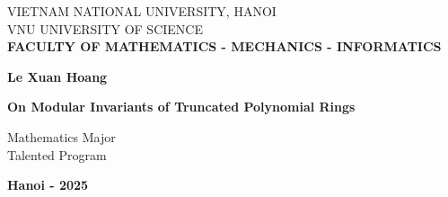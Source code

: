 \documentclass[12pt,a4paper]{report}
\theoremstyle{definition}
\theoremstyle{remark}
\theoremstyle{definition}
\begin{document}
\begin{titlepage}
	\thisfancypage{
		\setlength{\fboxsep}{1pt}
		\setlength{\fboxrule}{1.2pt}
		\doublebox}{}
	\vspace*{-0.5cm}
	\begin{center}
		{\fontsize{13pt}{1}\selectfont  VIETNAM NATIONAL UNIVERSITY, HANOI} \\
			{\fontsize{13pt}{1}\selectfont  VNU UNIVERSITY OF SCIENCE} \\
			{\fontsize{13pt}{1}\selectfont  \bf FACULTY OF MATHEMATICS - MECHANICS - INFORMATICS}
	\end{center}
	\vspace*{2.5cm}
	\begin{center}
		{\bf\fontsize{14pt}{1}\selectfont Le Xuan Hoang}
	\end{center}
	\vspace*{2.5cm}
	\begin{center}
		{\bf\fontsize{18pt}{1}\selectfont On Modular Invariants of Truncated Polynomial Rings}
	\end{center}
	\vspace*{0.5cm}
	\begin{center}
		{\fontsize{14pt}{1}\selectfont Mathematics Major}\\
		{\fontsize{14pt}{1}\selectfont Talented Program}\\
	\end{center}
	\vspace*{0.5cm}
	
	\vfill
	\begin{center}
		{\bf\fontsize{14pt}{1}\selectfont Hanoi - 2025}
	\end{center}
\end{titlepage}
\end{document}
